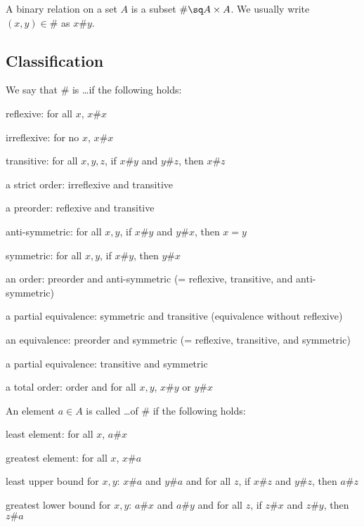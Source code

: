 A binary relation on a set $A$ is a subset $\#\sq A\times A$.
We usually write $(x,y)\in\#$ as $x\# y$.

\subsection{Classification}

\begin{definition}\label{def:math:binrel}
We say that $\#$ is \ldots if the following holds:
 \begin{compactitem}
 \item reflexive:  for all $x$, $x\# x$
 \item irreflexive:  for no $x$, $x\# x$
 \item transitive: for all $x,y,z$, if $x\# y$ and $y\# z$, then $x\# z$
 \item a strict order: irreflexive and transitive
 \item a preorder: reflexive and transitive
 \item anti-symmetric: for all $x,y$, if $x\# y$ and $y\# x$, then $x=y$
 \item symmetric: for all $x,y$, if $x\# y$, then $y\# x$
 \item an order\footnotemark: preorder and anti-symmetric (= reflexive, transitive, and anti-symmetric)
 \item a partial equivalence: symmetric and transitive (equivalence without reflexive)
 \item an equivalence: preorder and symmetric (= reflexive, transitive, and symmetric)
 \item a partial equivalence: transitive and symmetric
 \item a total order: order and for all $x,y$, $x\# y$ or $y\# x$
 \end{compactitem}

An element $a\in A$ is called \ldots of $\#$ if the following holds:
 \begin{compactitem}
  \item least element:  for all $x$, $a\# x$
  \item greatest element: for all $x$, $x\# a$
  \item least upper bound for $x,y$: $x\# a$ and $y\# a$ and for all $z$, if $x\# z$ and $y\# z$, then $a\# z$
  \item greatest lower bound for $x,y$: $a\# x$ and $a\# y$ and for all $z$, if $z\# x$ and $z\# y$, then $z\# a$
 \end{compactitem}
\end{definition}

